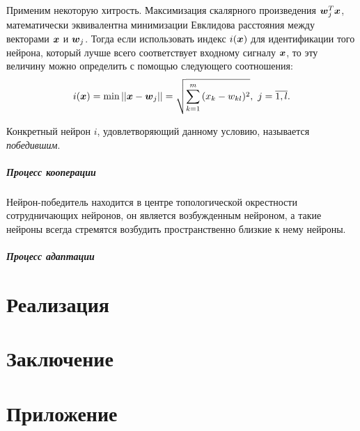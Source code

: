 \documentclass[a4paper,12pt]{report}
\begin{document}
Применим некоторую хитрость. Максимизация скалярного произведения
$\boldsymbol{w}_j^{T}\boldsymbol{x}$, математически эквивалентна минимизации Евклидова
расстояния между векторами $\boldsymbol{x}$ и $\boldsymbol{w}_j$. Тогда если
использовать индекс $i(\boldsymbol{x})$ для идентификации того нейрона, который
лучше всего соответствует входному сигналу $\boldsymbol{x}$, то эту величину
можно определить с помощью следующего соотношения:
\begin{equation}
    i(\boldsymbol{x}) = \min||\boldsymbol{x} - \boldsymbol{w}_j|| =
    \sqrt{\sum_{k=1}^{m}{(x_k-w_{kl})^{2}}} ,\ j = \overline{1,l}.
\end{equation}

Конкретный нейрон $i$, удовлетворяющий данному условию, называется
\textit{победившим}.

\paragraph{Процесс кооперации}
Нейрон-победитель находится в центре топологической окрестности
сотрудничающих нейронов, он является возбужденным нейроном, а такие
нейроны всегда стремятся возбудить пространственно близкие к нему
нейроны.
\paragraph{Процесс адаптации}

\chapter{Реализация}


\chapter{Заключение}


\chapter{Приложение}
\end{document}
